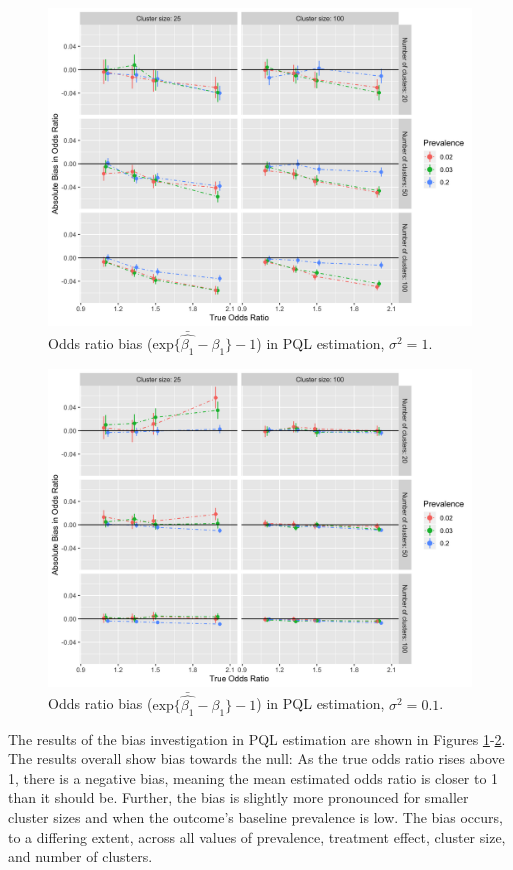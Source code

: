\documentclass[Afour,times,sagev,doublespace]{sagej}
\begin{document}
\begin{figure}
\centering
\includegraphics[width=\linewidth]{_bias_pql_sbs1.png}
  \caption{Odds ratio bias ($\text{exp} \{ \bar{\hat{\beta_1}} - \beta_1 \}-1$) in PQL estimation, $\sigma^2=1$.}
    \label{fig:_bias_pql_6}
\end{figure}

\begin{figure}
\centering
\includegraphics[width=\linewidth]{_bias_pql_sbspt1.png}
  \caption{Odds ratio bias ($\text{exp} \{ \bar{\hat{\beta_1}} - \beta_1 \} - 1$) in PQL estimation, $\sigma^2=0.1$.}
    \label{fig:_bias_pql_sbs_pt1}
\end{figure}


The results of the bias investigation in PQL estimation are shown in Figures \ref{fig:_bias_pql_6}-\ref{fig:_bias_pql_sbs_pt1}. The results overall show bias towards the null: As the true odds ratio rises above 1, there is a negative bias, meaning the mean estimated odds ratio is closer to 1 than it should be. Further, the bias is slightly more pronounced for smaller cluster sizes and when the outcome's baseline prevalence is low. The bias occurs, to a differing extent, across all values of prevalence, treatment effect, cluster size, and number of clusters.
\end{document}
